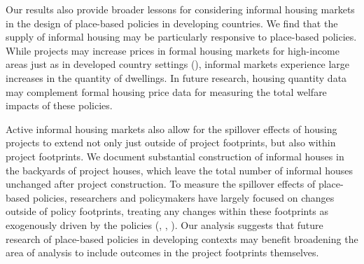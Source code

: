 \documentclass[12pt]{article}
\begin{document}

Our results also provide broader lessons for considering informal housing markets in the design of place-based policies in developing countries.  We find that the supply of informal housing may be particularly responsive to place-based policies.  While projects may increase prices in formal housing markets for high-income areas just as in developed country settings (\cite{diamond2016wants}), informal markets experience large increases in the quantity of dwellings.  In future research, housing quantity data may complement formal housing price data for measuring the total welfare impacts of these policies.  

Active informal housing markets also allow for the spillover effects of housing projects to extend not only just outside of project footprints, but also within project footprints.  We document substantial construction of informal houses in the backyards of project houses, which leave the total number of informal houses unchanged after project construction.  To measure the spillover effects of place-based policies, researchers and policymakers have largely focused on changes outside of policy footprints, treating any changes within these footprints as exogenously driven by the policies (\cite{diamond2016wants}, \cite{rossi2010housing}, \cite{hornbeck2017creative}).  Our analysis suggests that future research of place-based policies in developing contexts may benefit broadening the area of analysis to include outcomes in the project footprints themselves.
\end{document}
